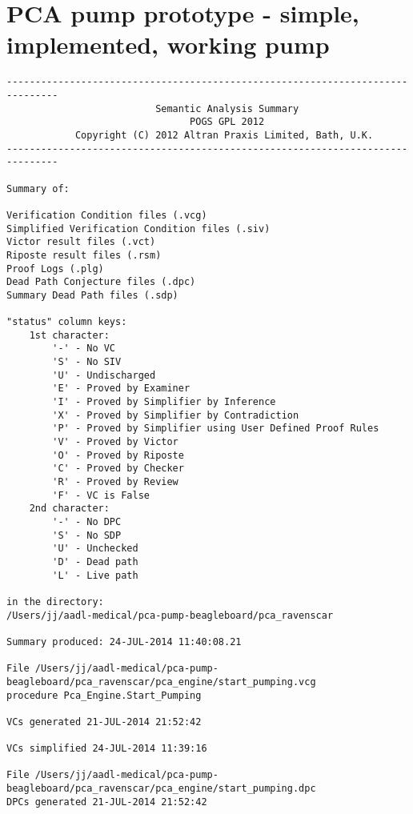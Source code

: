 
\cleardoublepage

\chapter{PCA pump prototype - simple, implemented, working pump}
\label{Appendix:pca_ravenscar:pogs}

\singlespacing
\begin{lstlisting}[frame=single, gobble=0, caption={POGS report for PCA Pump prototype}]
-------------------------------------------------------------------------------
                          Semantic Analysis Summary                            
                                POGS GPL 2012                                  
            Copyright (C) 2012 Altran Praxis Limited, Bath, U.K.               
-------------------------------------------------------------------------------

Summary of:

Verification Condition files (.vcg)
Simplified Verification Condition files (.siv)
Victor result files (.vct)
Riposte result files (.rsm)
Proof Logs (.plg)
Dead Path Conjecture files (.dpc)
Summary Dead Path files (.sdp)

"status" column keys:
    1st character:
        '-' - No VC
        'S' - No SIV
        'U' - Undischarged
        'E' - Proved by Examiner
        'I' - Proved by Simplifier by Inference
        'X' - Proved by Simplifier by Contradiction
        'P' - Proved by Simplifier using User Defined Proof Rules
        'V' - Proved by Victor
        'O' - Proved by Riposte
        'C' - Proved by Checker
        'R' - Proved by Review
        'F' - VC is False
    2nd character:
        '-' - No DPC
        'S' - No SDP
        'U' - Unchecked
        'D' - Dead path
        'L' - Live path

in the directory:
/Users/jj/aadl-medical/pca-pump-beagleboard/pca_ravenscar

Summary produced: 24-JUL-2014 11:40:08.21

File /Users/jj/aadl-medical/pca-pump-beagleboard/pca_ravenscar/pca_engine/start_pumping.vcg
procedure Pca_Engine.Start_Pumping

VCs generated 21-JUL-2014 21:52:42

VCs simplified 24-JUL-2014 11:39:16

File /Users/jj/aadl-medical/pca-pump-beagleboard/pca_ravenscar/pca_engine/start_pumping.dpc
DPCs generated 21-JUL-2014 21:52:42


\end{lstlisting}
